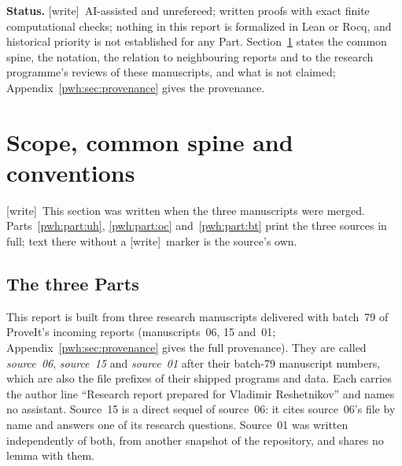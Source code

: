 \documentclass[11pt,letterpaper]{article}
\numberwithin{equation}{section}
\theoremstyle{definition}
\newcommand{\N}{\mathbb N}
\newcommand{\wtag}{\textup{[write]}}
\begin{document}
\begin{titlepage}
\begin{abstract}
Polynomial unknowns are not ordinary integer witnesses: nothing here is a
fixed-arity single-fold or finite-fold Diophantine representation over
$\N$, and the repository's 75- and 87-operation bounds are unchanged.
\end{abstract}
\vfill
\begin{statementbox}
\textbf{Status.} \wtag\ AI-assisted and unrefereed; written proofs with
exact finite computational checks; nothing in this report is formalized in
Lean or Rocq, and historical priority is not established for any Part.
Section~\ref{pwh:sec:front} states the common spine, the notation, the
relation to neighbouring reports and to the research programme's reviews
of these manuscripts, and what is not claimed; Appendix~\ref{pwh:sec:provenance}
gives the provenance.
\end{statementbox}
\end{titlepage}
\hypersetup{pageanchor=true}

\tableofcontents
\newpage

\section{Scope, common spine and conventions}\label{pwh:sec:front}

\wtag\ This section was written when the three manuscripts were merged.
Parts~\ref{pwh:part:uh}, \ref{pwh:part:oc} and~\ref{pwh:part:bt} print the
three sources in full; text there without a \wtag\ marker is the source's
own.

\subsection{The three Parts}\label{pwh:sec:parts}

This report is built from three research manuscripts delivered with
batch~79 of ProveIt's incoming reports (manuscripts~06, 15 and~01;
Appendix~\ref{pwh:sec:provenance} gives the full provenance). They are
called \emph{source~06}, \emph{source~15} and \emph{source~01} after their
batch-79 manuscript numbers, which are also the file prefixes of their
shipped programs and data. Each carries the author line ``Research report
prepared for Vladimir Reshetnikov'' and names no assistant. Source~15 is a
direct sequel of source~06: it cites source~06's file by name and answers
one of its research questions. Source~01 was written independently of both,
from another snapshot of the repository, and shares no lemma with them.
\end{document}
